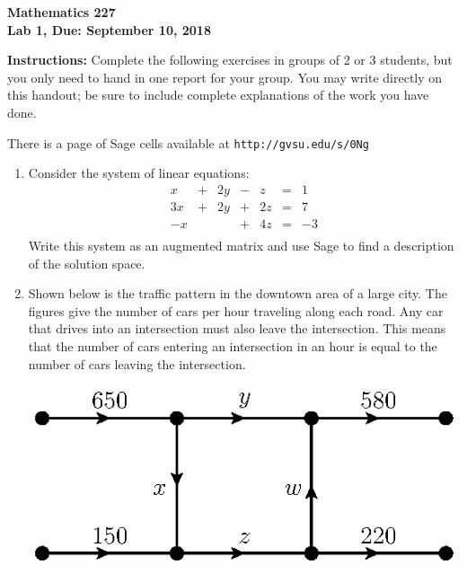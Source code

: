 \documentclass[12pt]{article}
\newcommand{\vs}[1]{\vspace{#1in}}
\begin{document}


\noindent
{\bf Mathematics 227} \\ 
{\bf Lab 1, Due: September 10, 2018} \\
\bigskip

\noindent
{\bf Instructions:} Complete the following exercises in
groups of 2 or 3 students, but you only need to hand in one report for
your group.  You may write directly on this handout; be sure to
include complete explanations of the work you have done.

\medskip
There is a page of Sage cells available at
{\tt http://gvsu.edu/s/0Ng}

\begin{enumerate}
\item Consider the system of linear equations:
  $$
  \begin{alignedat}{4}
    x & {}+{} & 2y & {}-{} & z & {}={} & 1 \\
    3x & {}+{} & 2y & {}+{} & 2z & {}={} & 7 \\
    -x & & & {}+{} & 4z & {}={} & -3 \\
  \end{alignedat}
  $$
  Write this system as an augmented matrix and use Sage to
  find a description of the solution space.

  \vs{2}

  \newpage
\item Shown below is the traffic pattern in the downtown area of
    a large city.  The figures give the number of cars per hour
    traveling along each road.  Any car that drives into an
    intersection must also leave the intersection.  This means that
    the number of cars entering an intersection in an hour is equal to
    the number of cars leaving the intersection.

    \begin{center}
      \includegraphics{traffic-a.eps}
    \end{center}


\end{enumerate}
\end{document}
